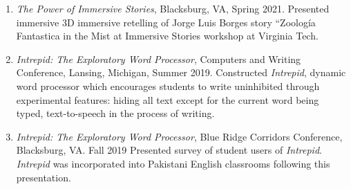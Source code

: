 \begin{enumerate}
      \item  \emph{The Power of Immersive Stories}, Blacksburg, VA, Spring 2021. \subitem Presented immersive 3D immersive retelling of Jorge Luis Borges story ``Zoolog\'ia Fantastica in the Mist at Immersive Stories workshop at Virginia Tech.  \\
      
      \item \emph{Intrepid: The Exploratory Word Processor}, Computers and Writing Conference, Lansing, Michigan, Summer 2019. \subitem Constructed \emph{Intrepid}, dynamic word processor which encourages students to write uninhibited through experimental features: hiding all text except for the current word being typed, text-to-speech in the process of writing.
      
      \item \emph{Intrepid: The Exploratory Word Processor}, Blue Ridge Corridors Conference, Blacksburg, VA. \hfill Fall 2019 \subitem Presented survey of student users of \emph{Intrepid}. \emph{Intrepid} was incorporated into Pakistani English classrooms following this presentation.
      
    \end{enumerate}